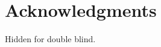 \documentclass{llncs}
\begin{document}
\section*{Acknowledgments}

Hidden for double blind.





\end{document}
